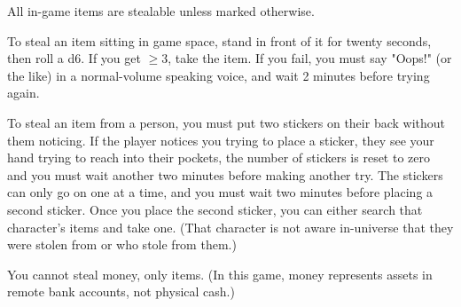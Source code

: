 \documentclass[green]{LRSguildcamp1}
\begin{document}
\name{\gStealing{}}

All in-game items are stealable unless marked otherwise.  

To steal an item sitting in game space, stand in front of it for twenty seconds, then roll a d6.  If you get $\ge 3$, take the item. If you fail, you must say "Oops!" (or the like) in a normal-volume speaking voice, and wait 2 minutes before trying again.

To steal an item from a person, you must put two stickers on their back without them noticing.  
If the player notices you trying to place a sticker, they see your hand trying to reach into their pockets, the number of stickers is reset to zero and you must wait another two minutes before making another try.  
The stickers can only go on one at a time, and you must wait two minutes before placing a second sticker.  Once you place the second sticker, you can either search that character's items and take one.  (That character is not aware in-universe that they were stolen from or who stole from them.)

You cannot steal money, only items.  (In this game, money represents assets in remote bank accounts, not physical cash.) 
\end{document}
